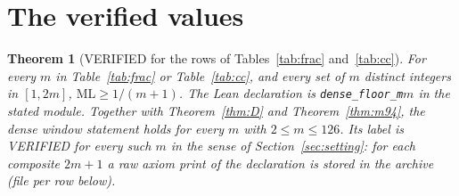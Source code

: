 \documentclass[11pt]{article}
\newtheorem{theorem}{Theorem}
\theoremstyle{remark}
\newcommand{\ML}{\mathrm{ML}}
\begin{document}
\section{The verified values}\label{sec:table}

\begin{theorem}[VERIFIED for the rows of Tables~\ref{tab:frac} and~\ref{tab:cc}]\label{thm:table}
For every $m$ in Table~\ref{tab:frac} or Table~\ref{tab:cc}, and every set of $m$ distinct integers in $[1,2m]$, $\ML\ge1/(m+1)$. The Lean declaration is \texttt{dense\_floor\_m$m$} in the stated module. Together with Theorem~\ref{thm:D} and Theorem~\ref{thm:m94}, the dense window statement holds for every $m$ with $2\le m\le126$. Its label is VERIFIED for every such $m$ in the sense of Section~\ref{sec:setting}: for each composite $2m+1$ a raw axiom print of the declaration is stored in the archive (file per row below).
\end{theorem}
\end{document}
